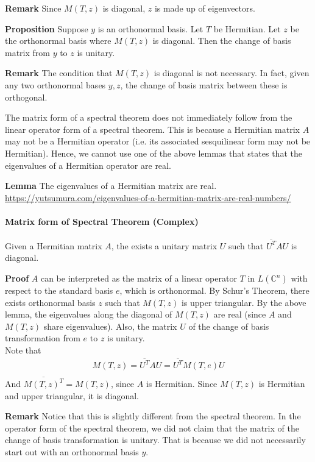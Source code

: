 \documentclass{article}
\begin{document}
\textbf{Remark} Since $M(T,z)$ is diagonal, $z$ is made up of eigenvectors.

\textbf{Proposition} Suppose $y$ is an orthonormal basis. Let $T$ be Hermitian. Let $z$ be the orthonormal basis where $M(T,z)$ is diagonal. Then the change of basis matrix from $y$ to $z$ is unitary.

\textbf{Remark} The condition that $M(T,z)$ is diagonal is not necessary. In fact, given any two orthonormal bases $y,z$, the change of basis matrix between these is orthogonal.


The matrix form of a spectral theorem does not immediately follow from the linear operator form of a spectral theorem. This is because a Hermitian matrix $A$ may not be a Hermitian operator (i.e. its associated sesquilinear form may not be Hermitian). Hence, we cannot use one of the above lemmas that states that the eigenvalues of a Hermitian operator are real.

\textbf{Lemma} The eigenvalues of a Hermitian matrix are real.\\
\url{https://yutsumura.com/eigenvalues-of-a-hermitian-matrix-are-real-numbers/}

\paragraph{Matrix form of Spectral Theorem (Complex)} Given a Hermitian matrix $A$, the exists a unitary matrix $U$ such that $\overline{U^T}AU$ is diagonal.

\textbf{Proof} $A$ can be interpreted as the matrix of a linear operator $T$ in $L(\mathbb{C}^n)$ with respect to the standard basis $e$, which is orthonormal. By Schur's Theorem, there exists orthonormal basis $z$ such that $M(T,z)$ is upper triangular. By the above lemma, the eigenvalues along the diagonal of $M(T,z)$ are real (since $A$ and $M(T,z)$ share eigenvalues). Also, the matrix $U$ of the change of basis transformation from $e$ to $z$ is unitary.\\
Note that 
\begin{align*}
	M(T,z) = \overline{U^T}AU=\overline{U^T}M(T,e)U\\
\end{align*}
And $\overline{M(T,z)^T} = M(T,z)$, since $A$ is Hermitian.
Since $M(T,z)$ is Hermitian and upper triangular, it is diagonal.

\textbf{Remark} Notice that this is slightly different from the spectral theorem. In the operator form of the spectral theorem, we did not claim that the matrix of the change of basis transformation is unitary. That is because we did not necessarily start out with an orthonormal basis $y$.
\end{document}

